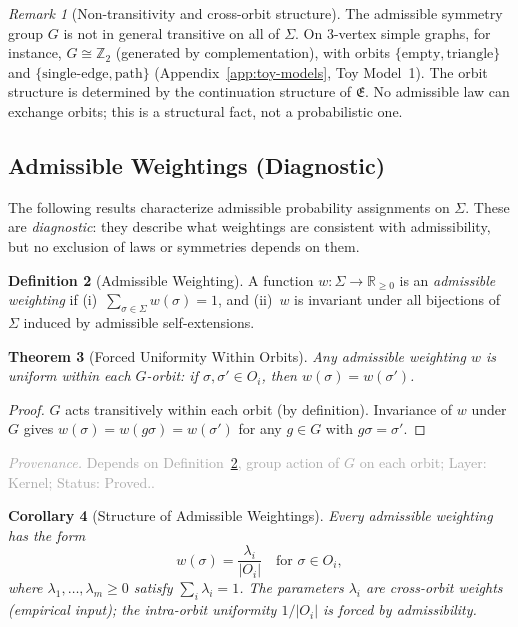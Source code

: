 \documentclass[11pt,a4paper]{article}
\newtheorem{theorem}{Theorem}[section]
\newtheorem{corollary}[theorem]{Corollary}
\theoremstyle{definition}
\newtheorem{definition}[theorem]{Definition}
\theoremstyle{remark}
\newtheorem{remark}[theorem]{Remark}
\newcommand{\assumptionfooter}[3]{%
  \par\smallskip\noindent\textcolor{darkgray}{\footnotesize\textit{Provenance.} Depends on #1; Layer: #2; Status: #3.}\par\medskip
}
\begin{document}
\begin{remark}[Non-transitivity and cross-orbit structure]\label{rem:transitivity}
The admissible symmetry group $G$ is not in general transitive on all of $\Sigma$. On 3-vertex simple graphs, for instance, $G \cong \mathbb{Z}_2$ (generated by complementation), with orbits $\{\text{empty}, \text{triangle}\}$ and $\{\text{single-edge}, \text{path}\}$ (Appendix~\ref{app:toy-models}, Toy Model~1). The orbit structure is determined by the continuation structure of $\mathfrak{E}$. No admissible law can exchange orbits; this is a structural fact, not a probabilistic one.
\end{remark}

\subsection{Admissible Weightings (Diagnostic)}

The following results characterize admissible probability assignments on $\Sigma$. These are \emph{diagnostic}: they describe what weightings are consistent with admissibility, but no exclusion of laws or symmetries depends on them.

\begin{definition}[Admissible Weighting]\label{def:weight}
A function $w \colon \Sigma \to \mathbb{R}_{\geq 0}$ is an \emph{admissible weighting} if (i)~$\sum_{\sigma \in \Sigma} w(\sigma) = 1$, and (ii)~$w$ is invariant under all bijections of $\Sigma$ induced by admissible self-extensions.
\end{definition}

\begin{theorem}[Forced Uniformity Within Orbits]\label{thm:uniform}
Any admissible weighting $w$ is uniform within each $G$-orbit: if $\sigma, \sigma' \in O_i$, then $w(\sigma) = w(\sigma')$.
\end{theorem}
\begin{proof}
$G$ acts transitively within each orbit (by definition). Invariance of $w$ under $G$ gives $w(\sigma) = w(g\sigma) = w(\sigma')$ for any $g \in G$ with $g\sigma = \sigma'$.
\end{proof}
\assumptionfooter{Definition~\ref{def:weight}, group action of $G$ on each orbit}{Kernel}{Proved.}

\begin{corollary}[Structure of Admissible Weightings]\label{cor:weight}
Every admissible weighting has the form
\[
  w(\sigma) = \frac{\lambda_i}{|O_i|} \quad \text{for } \sigma \in O_i,
\]
where $\lambda_1, \dots, \lambda_m \geq 0$ satisfy $\sum_i \lambda_i = 1$. The parameters $\lambda_i$ are cross-orbit weights (empirical input); the intra-orbit uniformity $1/|O_i|$ is forced by admissibility.
\end{corollary}
\end{document}
